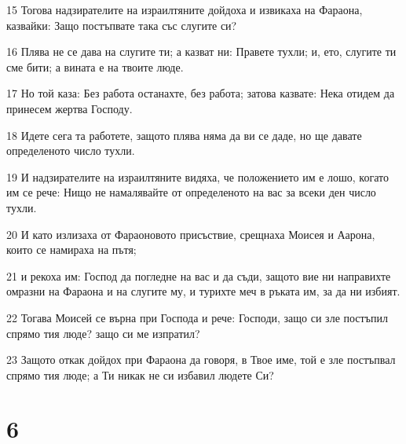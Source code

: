 \par 15 Тогова надзирателите на израилтяните дойдоха и извикаха на Фараона, казвайки: Защо постъпвате така със слугите си?
\par 16 Плява не се дава на слугите ти; а казват ни: Правете тухли; и, ето, слугите ти сме бити; а вината е на твоите люде.
\par 17 Но той каза: Без работа останахте, без работа; затова казвате: Нека отидем да принесем жертва Господу.
\par 18 Идете сега та работете, защото плява няма да ви се даде, но ще давате определеното число тухли.
\par 19 И надзирателите на израилтяните видяха, че положението им е лошо, когато им се рече: Нищо не намалявайте от определеното на вас за всеки ден число тухли.
\par 20 И като излизаха от Фараоновото присъствие, срещнаха Моисея и Аарона, които се намираха на пътя;
\par 21 и рекоха им: Господ да погледне на вас и да съди, защото вие ни направихте омразни на Фараона и на слугите му, и турихте меч в ръката им, за да ни избият.
\par 22 Тогава Моисей се върна при Господа и рече: Господи, защо си зле постъпил спрямо тия люде? защо си ме изпратил?
\par 23 Защото откак дойдох при Фараона да говоря, в Твое име, той е зле постъпвал спрямо тия люде; а Ти никак не си избавил людете Си?

\chapter{6}

